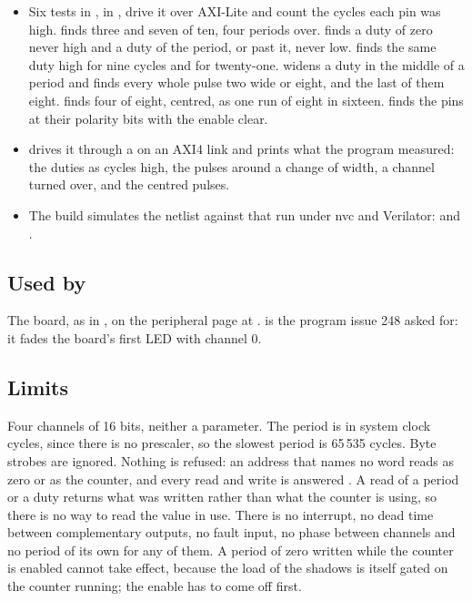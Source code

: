 \begin{itemize}
\item Six tests in , in
, drive it over AXI-Lite and count the
cycles each pin was high.
 finds three and seven
of ten, four periods over.
 finds a duty of zero never high and a duty of
the period, or past it, never low.
 finds the same duty high for
nine cycles and for twenty-one.
 widens a duty in the
middle of a period and finds every whole pulse two wide or eight, and
the last of them eight.
 finds four of eight,
centred, as one run of eight in sixteen.
 finds the pins at
their polarity bits with the enable clear.
\item {} drives it through a
 on an AXI4 link and prints what the program
measured: the duties as cycles high, the pulses around a change of
width, a channel turned over, and the centred pulses.
\item The build simulates the netlist against that run under nvc and
Verilator:  and
.
\end{itemize}

\subsection*{Used by}

The board, as  in , on the
peripheral page at .  is
the program issue 248 asked for: it fades the board's first LED with
channel 0.

\subsection*{Limits}

Four channels of 16 bits, neither a parameter. The period is in system
clock cycles, since there is no prescaler, so the slowest period is
65\,535 cycles. Byte strobes are ignored. Nothing is refused: an
address that names no word reads as zero or as the counter, and every
read and write is answered . A read of a period or a duty
returns what was written rather than what the counter is using, so
there is no way to read the value in use. There is no interrupt, no
dead time between complementary outputs, no fault input, no phase
between channels and no period of its own for any of them. A period of
zero written while the counter is enabled cannot take effect, because
the load of the shadows is itself gated on the counter running; the
enable has to come off first.
